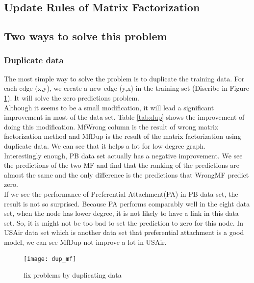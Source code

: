 \documentclass[12pt]{article}
\begin{document}
\subsection {Update Rules of Matrix Factorization}


\subsection{Two ways to solve this problem}

\subsubsection{Duplicate data}
The most simple way to solve the problem is to duplicate the training data. For each edge (x,y), we create a new edge (y,x) in the training set (Discribe in Figure \ref{fig:dup_mf}). It will solve the zero predictions problem. 
\\
Although it seems to be a small modification, it will lead a significant improvement in most of the data set.
Table \ref{tab:dup} shows the improvement of doing this modification. MfWrong column is the result of wrong matrix factorization method and MfDup is the result of the matrix factorization using duplicate data. We can see that it helps a lot for low degree graph. 
\\
Interestingly enough, PB data set actually has a negative improvement. We see the predictions of the two MF and find that the ranking of the predictions are almost the same and the only difference is the predictions that WrongMF predict zero. 
\\
If we see the performance of Preferential Attachment(PA) in PB data set, the result is not so surprised. Because PA performs comparably well in the eight data set, when the node has lower degree, it is not likely to have a link in this data set. So, it is might not be too bad to set the prediction to zero for this node. In USAir data set which is another data set that preferential attachment is a good model, we can see MfDup not improve a lot in USAir. 


\begin{figure}[h]
	\centering
	\texttt{[image: dup\_mf]}
	\caption{fix problems by duplicating data}
	\label{fig:dup_mf}
\end{figure}
\end{document}
